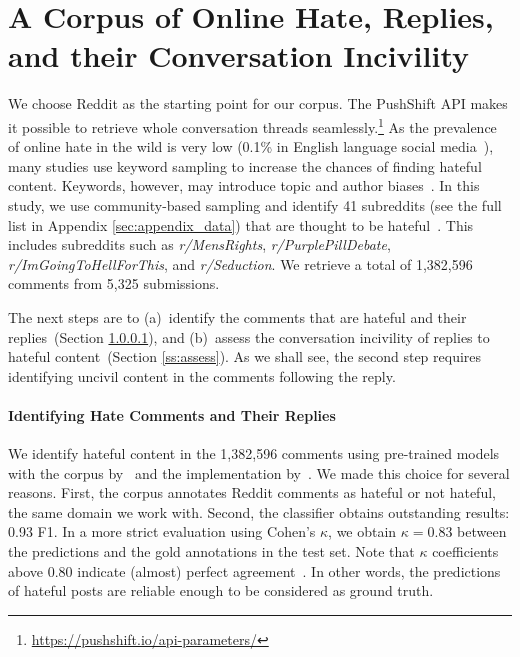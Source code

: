 \documentclass[11pt]{article}
\begin{document}
	
	\section{A Corpus of Online Hate, Replies, and their Conversation Incivility}
	\label{s:corpus}
	We choose Reddit as the starting point for our corpus.
	The PushShift API makes it possible to retrieve whole conversation threads seamlessly.\footnote{\url{https://pushshift.io/api-parameters/}}
	As the prevalence of online hate in the wild is very low (0.1\% in English language social media~\cite{vidgen-etal-2019-challenges}), many studies use keyword sampling to increase the chances of finding hateful content. 
	Keywords, however, may introduce topic and author biases~\cite{wiegand-etal-2019-detection,vidgen-etal-2021-introducing}. 
	In this study, we use community-based sampling and identify
	41 subreddits (see the full list in Appendix \ref{sec:appendix_data}) that are thought to be hateful~\cite{qian-etal-2019-benchmark,guest-etal-2021-expert,vidgen-etal-2021-introducing}. 
	This includes subreddits such as \textit{r/MensRights},  \textit{r/PurplePillDebate}, \textit{r/ImGoingToHellForThis}, and \textit{r/Seduction}.
	We retrieve a total of 1,382,596 comments from 5,325 submissions.
	
	The next steps are to 
	(a)~identify the comments that are hateful and their replies~(Section \ref{ss:identify}),
	and
	(b)~assess the conversation incivility of replies to hateful content~(Section \ref{ss:assess}).
	As we shall see, the second step requires identifying uncivil content in the comments following the reply.
	
	\paragraph{Identifying Hate Comments and Their Replies}
	\label{ss:identify}
	We identify hateful content in the 1,382,596 comments using pre-trained models \cite{DBLP:journals/corr/abs-1907-11692} with the corpus by~\citet{qian-etal-2019-benchmark}
	and
	the implementation by~\citet{phang2020jiant}.
	We made this choice for several reasons.
	First, the corpus annotates Reddit comments as hateful or not hateful, the same domain we work with.
	Second, the classifier obtains outstanding results: 0.93 F1.
	In a more strict evaluation using Cohen's $\kappa$, we obtain $\kappa=0.83$ between the predictions and the gold annotations in the test set.
	Note that $\kappa$ coefficients above $0.80$ indicate (almost) perfect agreement~\cite{artstein2008inter}.
	In other words, the predictions of hateful posts are reliable enough to be considered as ground truth.
	
\end{document}
